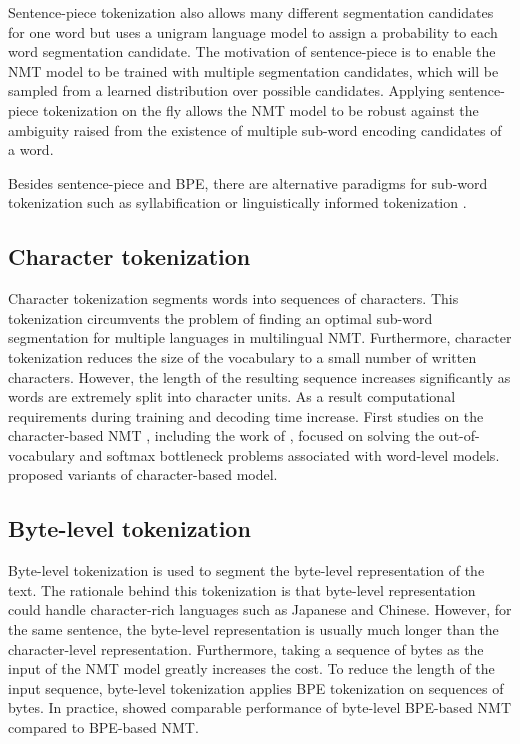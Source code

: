 Sentence-piece tokenization also allows many different segmentation candidates for one word but uses a unigram language model to assign a probability to each word segmentation candidate. The motivation of sentence-piece is to enable the NMT model to be trained with multiple segmentation candidates, which will be sampled from a learned distribution over possible candidates. Applying sentence-piece tokenization on the fly allows the NMT model to be robust against the ambiguity raised from the existence of multiple sub-word encoding candidates of a word. 

Besides sentence-piece and BPE, there are alternative paradigms for sub-word tokenization such as syllabification \citep{Assylbekov17syllable} or linguistically informed tokenization \citep{Ataman17linguistically, Huck17target, Machcek18morphological}.
\subsection{Character tokenization}
Character tokenization segments words into sequences of characters. This tokenization circumvents the problem of finding an optimal sub-word segmentation for multiple languages in multilingual NMT. Furthermore, character tokenization reduces the size of the vocabulary to a small number of written characters. However, the length of the resulting sequence increases significantly as words are extremely split into character units. As a result computational requirements during training and decoding time increase. First studies on the character-based NMT , including the work of \citet{Wang15character,Luong16achieving}, focused on solving the out-of-vocabulary and softmax bottleneck problems associated with word-level models. \citet{Costa16character, Chung16character, Lee17fully, costa17byte} proposed variants of character-based model.
\subsection{Byte-level tokenization}
Byte-level tokenization is used to segment the byte-level representation of the text. The rationale behind this tokenization is that byte-level representation could handle character-rich languages such as Japanese and Chinese. However, for the same sentence, the byte-level representation is usually much longer than the character-level representation. Furthermore, taking a sequence of bytes as the input of the NMT model greatly increases the cost. To reduce the length of the input sequence, byte-level tokenization applies BPE tokenization on sequences of bytes. In practice, \citet{Wang19neural} showed comparable performance of byte-level BPE-based NMT compared to BPE-based NMT. 
